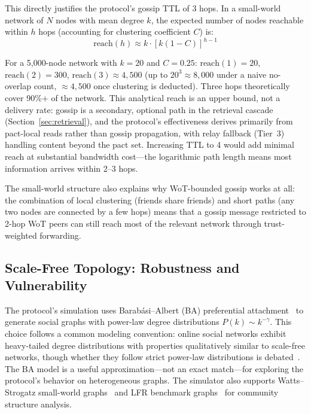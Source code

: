 \documentclass[11pt,a4paper]{article}
\begin{document}
This directly justifies the protocol's gossip TTL of 3 hops. In a small-world network of $N$ nodes with mean degree $k$, the expected number of nodes reachable within $h$ hops (accounting for clustering coefficient $C$) is:
\begin{equation}
  \text{reach}(h) \approx k \cdot [k(1-C)]^{h-1}
\end{equation}

For a 5,000-node network with $k=20$ and $C=0.25$: $\text{reach}(1) = 20$, $\text{reach}(2) = 300$, $\text{reach}(3) \approx 4{,}500$ (up to $20^3 \approx 8{,}000$ under a naive no-overlap count, ${\approx}4{,}500$ once clustering is deducted). Three hops theoretically cover 90\%+ of the network. This analytical reach is an upper bound, not a delivery rate: gossip is a secondary, optional path in the retrieval cascade (Section~\ref{sec:retrieval}), and the protocol's effectiveness derives primarily from pact-local reads rather than gossip propagation, with relay fallback (Tier~3) handling content beyond the pact set. Increasing TTL to 4 would add minimal reach at substantial bandwidth cost---the logarithmic path length means most information arrives within 2--3 hops.

The small-world structure also explains why WoT-bounded gossip works at all: the combination of local clustering (friends share friends) and short paths (any two nodes are connected by a few hops) means that a gossip message restricted to 2-hop WoT peers can still reach most of the relevant network through trust-weighted forwarding.

\subsection{Scale-Free Topology: Robustness and Vulnerability}

The protocol's simulation uses Barab\'{a}si--Albert (BA) preferential attachment~\cite{barabasi-albert} to generate social graphs with power-law degree distributions $P(k) \sim k^{-\gamma}$. This choice follows a common modeling convention: online social networks exhibit heavy-tailed degree distributions with properties qualitatively similar to scale-free networks, though whether they follow strict power-law distributions is debated~\cite{broido-clauset}. The BA model is a useful approximation---not an exact match---for exploring the protocol's behavior on heterogeneous graphs. The simulator also supports Watts--Strogatz small-world graphs~\cite{watts-strogatz} and LFR benchmark graphs~\cite{lancichinetti-lfr} for community structure analysis.
\end{document}
